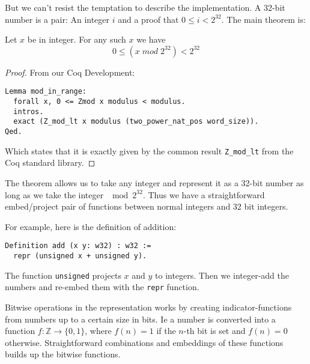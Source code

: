 But we can't resist the temptation to describe the implementation. A
32-bit number is a pair: An integer $i$ and a proof that $0 \leq i <
2^{32}$. The main theorem is:
\begin{thm}
  Let $x$ be in integer. For any such $x$ we have
  \begin{equation*}
    0 \leq (x \;mod\; 2^{32}) < 2^{32}
  \end{equation*}
\end{thm}
\begin{proof}
  From our Coq Development:
\begin{verbatim}
Lemma mod_in_range:
  forall x, 0 <= Zmod x modulus < modulus.
  intros.
  exact (Z_mod_lt x modulus (two_power_nat_pos word_size)).
Qed.
\end{verbatim}
  Which states that it is exactly given by the common result
  \texttt{Z\_mod\_lt} from the Coq standard library.
\end{proof}
The theorem allows us to take any integer and represent it as a 32-bit
number as long as we take the integer $\mod 2^{32}$. Thus we have a
straightforward embed/project pair of functions between normal
integers and 32 bit integers.

For example, here is the definition of addition:
\begin{verbatim}
Definition add (x y: w32) : w32 :=
  repr (unsigned x + unsigned y).
\end{verbatim}
The function \texttt{unsigned} projects $x$ and $y$ to integers. Then
we integer-add the numbers and re-embed them with the \texttt{repr}
function.

Bitwise operations in the representation works by creating
indicator-functions from numbers up to a certain size in bits. Ie a
number is converted into a function $f \colon \mathbb{Z} \to \{0,
1\}$, where $f(n) = 1$ if the $n$-th bit is set and $f(n) = 0$
otherwise. Straightforward combinations and embeddings of these
functions builds up the bitwise functions.

